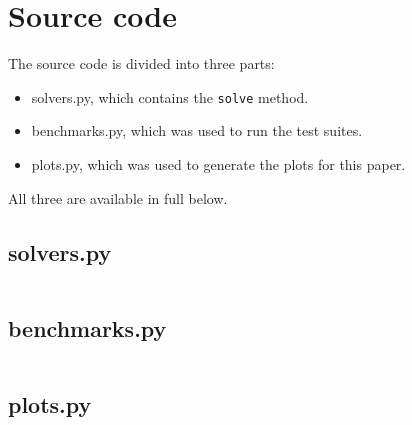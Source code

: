 \documentclass[final]{aomart}
\newcommand{\py}[1]{\texttt{#1}}
\newcommand{\ntt}{\normalfont\ttfamily}
\newcommand{\fn}[1]{{\protect\ntt#1}}
\newtheorem[{}\it]{thm}{Theorem}[section]
\theoremstyle{definition}
\newtheorem*[{}\it]{notation}{Notation}
\numberwithin{equation}{section}
\begin{document}
\section{Source code}
\label{sec:code}
The source code is divided into three parts:
\begin{itemize}
	\item \fn{solvers.py}, which contains the \py{solve} method.
	\item \fn{benchmarks.py}, which was used to run the test suites.
	\item \fn{plots.py}, which was used to generate the plots for this paper.
\end{itemize}
All three are available in full below.

\subsection{\fn{solvers.py}}
\inputminted[xleftmargin=\parindent,linenos,breaklines,frame=lines,framesep=2mm]{Python}{../src/solvers.py}

\subsection{\fn{benchmarks.py}}
\inputminted[xleftmargin=\parindent,linenos,breaklines,frame=lines,framesep=2mm]{Python}{../src/benchmarks.py}

\subsection{\fn{plots.py}}
\inputminted[xleftmargin=\parindent,linenos,breaklines,frame=lines,framesep=2mm]{Python}{../src/plots.py}
\end{document}
